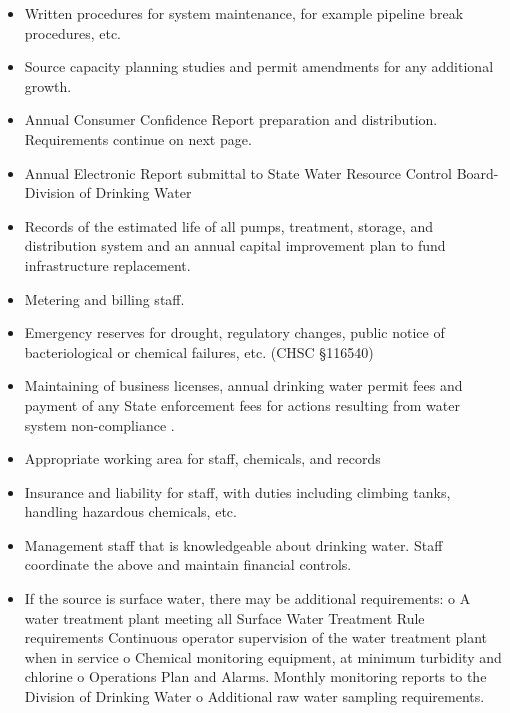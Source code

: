 \begin{itemize}
\begin{itemize}
\item  Written procedures for system maintenance, for example pipeline break procedures, etc.\\
\item  Source capacity planning studies and permit amendments for any additional growth.\\
\item  Annual Consumer Confidence Report preparation and distribution. Requirements continue on next page.\\
\item  Annual Electronic Report submittal to State Water Resource Control Board-Division of Drinking Water \\
\item  Records of the estimated life of all pumps, treatment, storage, and distribution system and an annual capital improvement plan to fund infrastructure replacement.\\
\item  Metering and billing staff.\\
\item  Emergency reserves for drought, regulatory changes, public notice of bacteriological or chemical failures, etc. (CHSC §116540) \\
\item  Maintaining of business licenses, annual drinking water permit fees and payment of any State enforcement fees for actions resulting from water system non-compliance .\\
\item  Appropriate working area for staff, chemicals, and records \\
\item  Insurance and liability for staff, with duties including climbing tanks, handling hazardous chemicals, etc. \\
\item  Management staff that is knowledgeable about drinking water. Staff coordinate the above and maintain financial controls.\\
\item  If the source is surface water, there may be additional requirements: o A water treatment plant meeting all Surface Water Treatment Rule requirements  Continuous operator supervision of the water treatment plant when in service o Chemical monitoring equipment, at minimum turbidity and chlorine  o Operations Plan and Alarms. Monthly monitoring reports to the Division of Drinking Water o Additional raw water sampling requirements.




\end{itemize}
\end{itemize}

